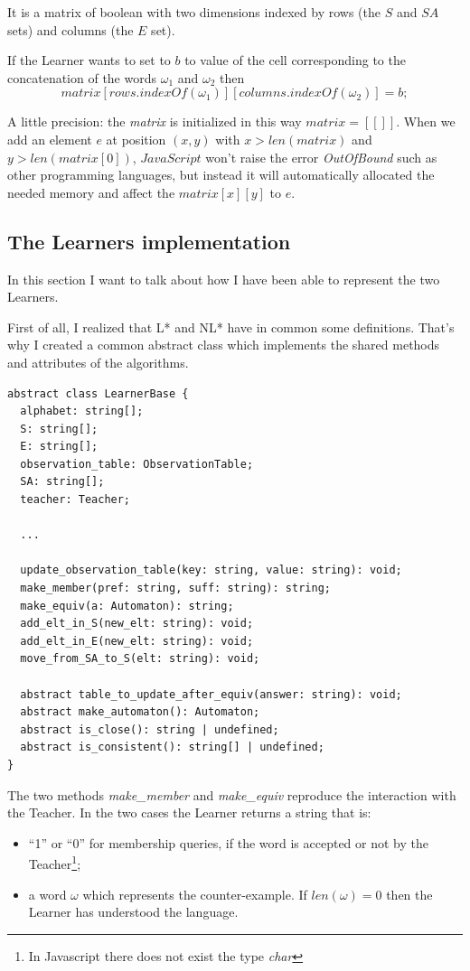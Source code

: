 It is a matrix of boolean with two dimensions indexed by rows (the $S$ and $SA$ sets) and columns (the $E$ set).

If the Learner wants to set to $b$ to value of the cell corresponding to the concatenation of the words $\omega_1$ and $\omega_2$ then
\[matrix[rows.indexOf(\omega_1)][columns.indexOf(\omega_2)] = b;\]

A little precision: the \textit{matrix} is initialized in this way $matrix = [[]]$. When we add an element $e$ at position $(x, y)$ with $x > len(matrix)$ and $y > len(matrix[0])$, $JavaScript$ won't raise the error \textit{OutOfBound} such as other programming languages, but instead it will automatically allocated the needed memory and affect the $matrix[x][y]$ to $e$.

\subsection{The Learners implementation}

In this section I want to talk about how I have been able to represent the two Learners.

First of all, I realized that L* and NL* have in common some definitions. That's why I created a common abstract class which implements the shared methods and attributes of the algorithms.

\begin{verbatim}
abstract class LearnerBase {
  alphabet: string[];
  S: string[];
  E: string[];
  observation_table: ObservationTable;
  SA: string[];
  teacher: Teacher;

  ...

  update_observation_table(key: string, value: string): void;
  make_member(pref: string, suff: string): string;
  make_equiv(a: Automaton): string;
  add_elt_in_S(new_elt: string): void;
  add_elt_in_E(new_elt: string): void;
  move_from_SA_to_S(elt: string): void;

  abstract table_to_update_after_equiv(answer: string): void;
  abstract make_automaton(): Automaton;
  abstract is_close(): string | undefined;
  abstract is_consistent(): string[] | undefined;
}
\end{verbatim}

The two methods \textit{make\_member} and \textit{make\_equiv} reproduce the interaction with the Teacher. In the two cases the Learner returns a string that is:

\begin{itemize}
  \item ``1'' or ``0'' for membership queries, if the word is accepted or not by the Teacher\footnote{In Javascript there does not exist the type \textit{char}};
  \item a word $\omega$ which represents the counter-example. If $len(\omega) = 0$ then the Learner has understood the language.
\end{itemize}

